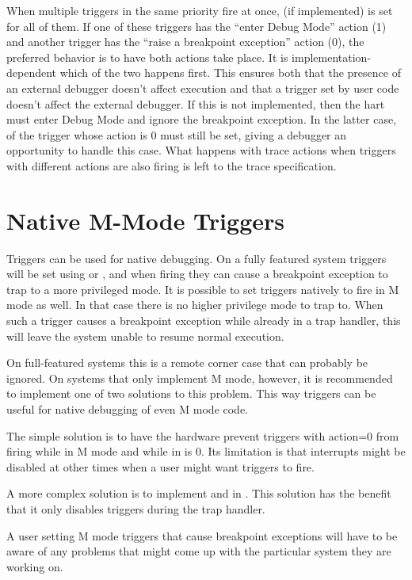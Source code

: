 When multiple triggers in the same priority fire at once, \FcsrMcontrolHit (if
implemented) is set for all of them. If one of these triggers has
the ``enter Debug Mode'' action (1) and another
trigger has the ``raise a breakpoint exception'' action (0),
the preferred behavior is to have both actions take place.  It is
implementation-dependent which of the two happens first.  This ensures both
that the presence of an external debugger doesn't affect execution and that a
trigger set by user code doesn't affect the external debugger. If this is not
implemented, then the hart must enter Debug Mode and ignore the breakpoint
exception. In the latter case, \FcsrMcontrolHit of the trigger whose action is 0 must still
be set, giving a debugger an opportunity to handle this case. What happens with
trace actions when triggers with different actions are also firing is left to
the trace specification.

\section{Native M-Mode Triggers}
\label{sec:mmtrigger}

Triggers can be used for native debugging. On a fully featured system triggers
will be set using \FcsrMcontrolU or \FcsrMcontrolS, and when firing they can cause a breakpoint exception
to trap to a more privileged mode. It is possible to set triggers natively to
fire in M mode as well. In that case there is no higher privilege mode to trap
to. When such a trigger causes a breakpoint exception while already in a trap
handler, this will leave the system unable to resume normal execution.

On full-featured systems this is a remote corner case that can probably be
ignored. On systems that only implement M mode, however, it is recommended to
implement one of two solutions to this problem. This way triggers can be useful
for native debugging of even M mode code.

The simple solution is to have the hardware prevent triggers with action=0 from
firing while in M mode and while \FcsrMcontrolMie in \Rmstatus is 0. Its limitation is
that interrupts might be disabled at other times when a user might want
triggers to fire.

A more complex solution is to implement \FcsrTcontrolMte and \FcsrTcontrolMpte in \RcsrTcontrol. This
solution has the benefit that it only disables triggers during the trap
handler.

A user setting M mode triggers that cause breakpoint exceptions will have to be
aware of any problems that might come up with the particular system they are
working on.

